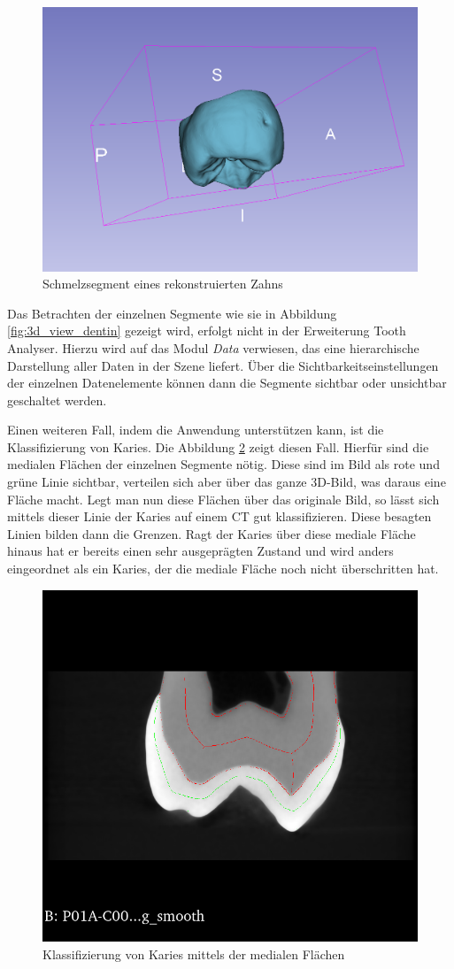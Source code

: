 \begin{figure}[h]
\begin{minipage}[b]{0.32\textwidth}
		\includegraphics[width=\textwidth]{img/3dViewEnamel.png}
		\caption{Schmelzsegment eines rekonstruierten Zahns}
		\label{fig:3d_view_schmelz}
	\end{minipage}
\end{figure}

Das Betrachten der einzelnen Segmente wie sie in Abbildung
\ref{fig:3d_view_dentin} gezeigt wird, erfolgt nicht in der Erweiterung Tooth Analyser.
Hierzu wird auf das Modul \textit{Data} verwiesen, das eine hierarchische
Darstellung aller Daten in der Szene liefert. Über die Sichtbarkeitseinstellungen
der einzelnen Datenelemente können dann die Segmente sichtbar oder unsichtbar geschaltet
werden.

Einen weiteren Fall, indem die Anwendung unterstützen kann, ist die Klassifizierung
von Karies. Die Abbildung \ref{fig:classification} zeigt diesen Fall. Hierfür sind
die medialen Flächen der einzelnen Segmente nötig. Diese sind im Bild als rote
und grüne Linie sichtbar, verteilen sich aber über das ganze \ac{3D}-Bild, was daraus
eine Fläche macht. Legt man nun diese Flächen über das originale Bild, so lässt sich
mittels dieser Linie der Karies auf einem \ac{CT} gut klassifizieren. Diese besagten
Linien bilden dann die Grenzen. Ragt der Karies über diese mediale Fläche hinaus
hat er bereits einen sehr ausgeprägten Zustand und wird anders eingeordnet als
ein Karies, der die mediale Fläche noch nicht überschritten hat.

\begin{figure}[h]
	\centering
	\includegraphics[width=0.4 \textwidth]{img/classification.png}
	\caption{Klassifizierung von Karies mittels der medialen Flächen}
	\label{fig:classification}
\end{figure}

